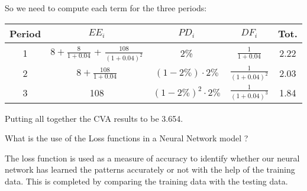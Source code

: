 \documentclass[12pt,a4paper]{exam}
\begin{document}
\begin{questions}
\begin{solution}
So we need to compute each term for the three periods:

\begin{center}
\begin{tabular}{|c|c|c|c|c|}
\hline
Period & $EE_i$ & $PD_i$ & $DF_i$ & Tot. \\
\hline
1 & $8 + \frac{8}{1+0.04}$ + $\frac{108}{(1+0.04)^2}$ & 2\% & $\frac{1}{1+0.04}$ & 2.22 \\
\hline
2 & $8 + \frac{108}{1+0.04}$ & $(1-2\%)\cdot 2\%$ & $\frac{1}{(1+0.04)^2}$ & 2.03 \\
\hline
3 & 108 & $(1-2\%)^2\cdot 2\%$ & $\frac{1}{(1+0.04)^3}$ & 1.84 \\
\hline
\end{tabular}
\end{center}
Putting all together the CVA results to be 3.654.
\end{solution}

\question
What is the use of the Loss functions in a Neural Network model ?
\fillwithlines{3cm}
\begin{solution}
The loss function is used as a measure of accuracy to identify whether our neural network has learned the patterns accurately or not with the help of the training data.
This is completed by comparing the training data with the testing data.
\end{solution}

\end{questions}
\end{document}

